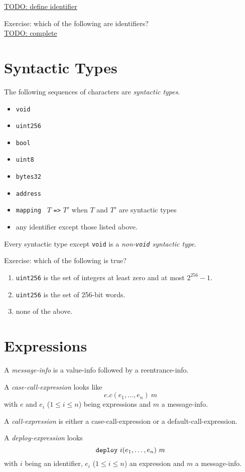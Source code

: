 \documentclass{book}
\newcommand{\todo}[1]{\underline{TODO: {#1}}}
\begin{document}
\todo{define identifier}


Exercise: which of the following are identifiers? \\
\todo{complete}

\section{Syntactic Types}

The following sequences of characters are \textit{syntactic types}.
\begin{itemize}
\item \texttt{void}
\item \texttt{uint256}
\item \texttt{bool}
\item \texttt{uint8}
\item \texttt{bytes32}
\item \texttt{address}
\item \texttt{mapping } $T$ \texttt{=>} $T'$ when $T$ and $T'$ are syntactic types
\item any identifier except those listed above.
\end{itemize}

Every syntactic type except \texttt{void} is a \textit{non-\texttt{void} syntactic type}.

Exercise: which of the following is true?
\begin{enumerate}
\item \texttt{uint256} is the set of integers at least zero and at most $2^{256} - 1$.
\item \texttt{uint256} is the set of 256-bit words.
\item none of the above.
\end{enumerate}

\section{Expressions}

A \textit{message-info} is a value-info followed by a reentrance-info.

A \textit{case-call-expression} looks like
\[
e . c (e_1, \ldots, e_n)\ m
\]
with $e$ and $e_i$ ($1 \le i \le n$) being expressions and $m$ a message-info.

A \textit{call-expression} is either a case-call-expression or a default-call-expression.

A \textit{deploy-expression} looks
\[
\text{\texttt{deploy}}\ i(e_1,\ldots,e_n)\ m
\]
with $i$ being an identifier, $e_i$ ($1 \le i \le n$) an expression and $m$ a message-info.
\end{document}
